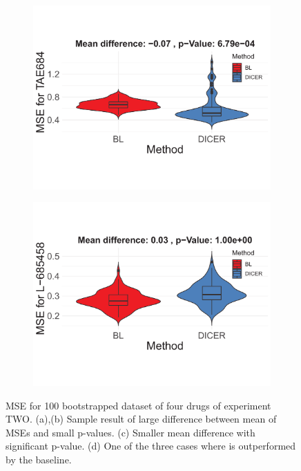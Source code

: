 \begin{figure}
\begin{subfigure}[b]{0.22\textwidth}
		\centering 
		\includegraphics[width=\textwidth]{./img/bar3.pdf}
		\caption{}    
	\end{subfigure}
	\quad
	\begin{subfigure}[b]{0.22\textwidth}   
		\centering 
		\includegraphics[width=\textwidth]{./img/bar4.pdf}
		\caption{}    
	\end{subfigure}
	\squeezeup
	\caption{MSE for 100 bootstrapped dataset of four drugs of experiment TWO. (a),(b) Sample result of large difference between mean of MSEs and small p-values. (c) Smaller mean difference with significant p-value. (d) One of the three cases where \dc{} is outperformed by the baseline.} 
	\label{fig:allbars}
	\end{figure}



